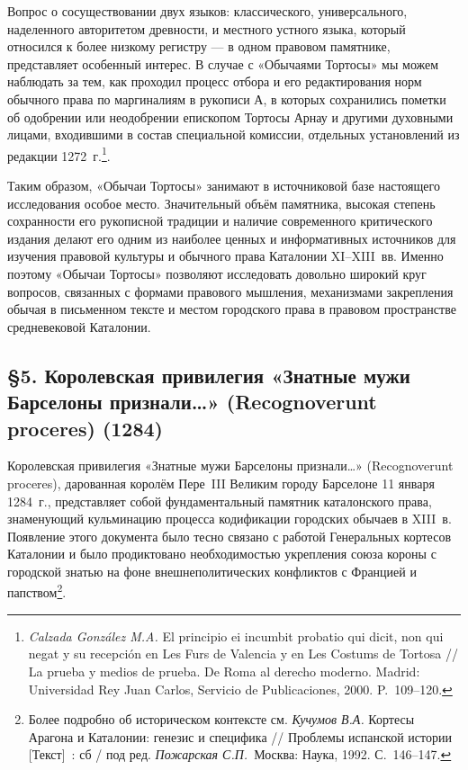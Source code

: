 Вопрос о сосуществовании двух языков: классического, универсального, наделенного авторитетом древности, и местного устного языка, который относился к более низкому регистру --- в одном правовом памятнике, представляет особенный интерес. В случае с «Обычаями Тортосы» мы можем наблюдать за тем, как проходил процесс отбора и его редактирования норм обычного права по маргиналиям в рукописи А, в которых сохранились пометки об одобрении или неодобрении епископом Тортосы Арнау и другими духовными лицами, входившими в состав специальной комиссии, отдельных установлений из редакции 1272~г.\footnote{\emph{Calzada González M.A.} El principio ei incumbit probatio qui dicit, non qui negat y su recepción en Les Furs de Valencia y en Les Costums de Tortosa // La prueba y medios de prueba. De Roma al derecho moderno. Madrid: Universidad Rey Juan Carlos, Servicio de Publicaciones, 2000. P.~109--120.}.

Таким образом, «Обычаи Тортосы» занимают в источниковой базе настоящего исследования особое место. Значительный объём памятника, высокая степень сохранности его рукописной традиции и наличие современного критического издания делают его одним из наиболее ценных и информативных источников для изучения правовой культуры и обычного права Каталонии XI--XIII~вв. Именно поэтому «Обычаи Тортосы» позволяют исследовать довольно широкий круг вопросов, связанных с формами правового мышления, механизмами закрепления обычая в письменном тексте и местом городского права в правовом пространстве средневековой Каталонии.

\subsection*{§5. Королевская привилегия «Знатные мужи Барселоны признали…» (Recognoverunt proceres) (1284)}

Королевская привилегия «Знатные мужи Барселоны признали…» (Recognoverunt proceres), дарованная королём Пере~III Великим городу Барселоне 11 января 1284~г., представляет собой фундаментальный памятник каталонского права, знаменующий кульминацию процесса кодификации городских обычаев в XIII~в. Появление этого документа было тесно связано с работой Генеральных кортесов Каталонии и было продиктовано необходимостью укрепления союза короны с городской знатью на фоне внешнеполитических конфликтов с Францией и папством\footnote{Более подробно об историческом контексте см. \emph{Кучумов В.}\emph{А}\emph{.} Кортесы Арагона и Каталонии: генезис и специфика // Проблемы испанской истории [Текст]~: сб / под ред. \emph{Пожарская С.П.}~Москва: Наука, 1992. С.~146--147.}.

